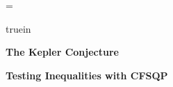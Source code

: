 \magnification=
\nopagenumbers

\hbox{}
 truein
\centerline{\bf The Kepler Conjecture}
\bigskip
\centerline{\bf Testing Inequalities with CFSQP}
\vfill
\eject
\bye


